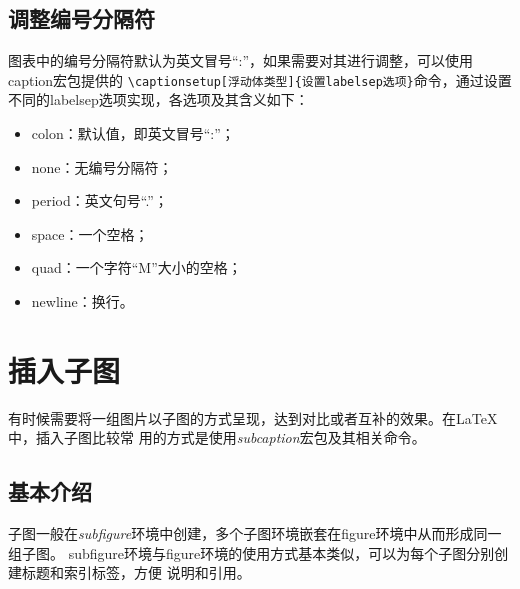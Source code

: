 \subsection{调整编号分隔符}

图表中的编号分隔符默认为英文冒号“:”，如果需要对其进行调整，可以使用caption宏包提供的
\texttt{\textbackslash{}captionsetup[浮动体类型]\{设置labelsep选项\}}命令，通过设置
不同的labelsep选项实现，各选项及其含义如下：
\begin{itemize}
    \item colon：默认值，即英文冒号“:”；
    \item none：无编号分隔符；
    \item period：英文句号“.”；
    \item space：一个空格；
    \item quad：一个字符“M”大小的空格；
    \item newline：换行。
\end{itemize}

\section{插入子图}

有时候需要将一组图片以子图的方式呈现，达到对比或者互补的效果。在LaTeX中，插入子图比较常
用的方式是使用\emph{subcaption}宏包及其相关命令。

\subsection{基本介绍}

子图一般在\emph{subfigure}环境中创建，多个子图环境嵌套在figure环境中从而形成同一组子图。
subfigure环境与figure环境的使用方式基本类似，可以为每个子图分别创建标题和索引标签，方便
说明和引用。


